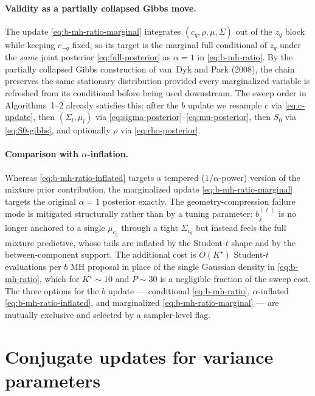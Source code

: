 \documentclass[11pt]{article}
\begin{document}
\paragraph{Validity as a partially collapsed Gibbs move.}
The update \eqref{eq:b-mh-ratio-marginal} integrates $(c_q,\rho,\mu,\Sigma)$
out of the $z_q$ block while keeping $c_{-q}$ fixed, so its target is the
marginal full conditional of $z_q$ under the \emph{same} joint posterior
\eqref{eq:full-posterior} as $\alpha=1$ in \eqref{eq:b-mh-ratio}.  By the
partially collapsed Gibbs construction of van~Dyk and Park (2008), the chain
preserves the same stationary distribution provided every marginalized
variable is refreshed from its conditional before being used downstream.
The sweep order in Algorithms~1--2 already satisfies this: after the $b$
update we resample $c$ via \eqref{eq:c-update}, then $(\Sigma_l,\mu_l)$ via
\eqref{eq:sigma-posterior}--\eqref{eq:mu-posterior}, then $S_0$ via
\eqref{eq:S0-gibbs}, and optionally $\rho$ via \eqref{eq:rho-posterior}.

\paragraph{Comparison with $\alpha$-inflation.}
Whereas \eqref{eq:b-mh-ratio-inflated} targets a tempered
($1/\alpha$-power) version of the mixture prior contribution, the
marginalized update \eqref{eq:b-mh-ratio-marginal} targets the original
$\alpha=1$ posterior exactly.  The geometry-compression failure mode is
mitigated structurally rather than by a tuning parameter: $b_j^{(\ell)}$ is
no longer anchored to a single $\mu_{c_q}$ through a tight $\Sigma_{c_q}$
but instead feels the full mixture predictive, whose tails are inflated by
the Student-$t$ shape and by the between-component support.  The additional
cost is $O(K^\star)$ Student-$t$ evaluations per $b$ MH proposal in place
of the single Gaussian density in \eqref{eq:b-mh-ratio}, which for
$K^\star\sim 10$ and $P\sim 30$ is a negligible fraction of the sweep cost.
The three options for the $b$ update --- conditional \eqref{eq:b-mh-ratio},
$\alpha$-inflated \eqref{eq:b-mh-ratio-inflated}, and marginalized
\eqref{eq:b-mh-ratio-marginal} --- are mutually exclusive and selected by
a sampler-level flag.

\section{Conjugate updates for variance parameters}
\end{document}
